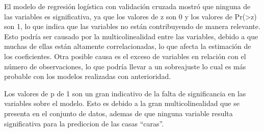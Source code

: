 \documentclass[
]{article}
\begin{document}
El modelo de regresión logística con validación cruzada mostró que
ninguna de las variables es significativa, ya que los valores de z son 0
y los valores de Pr(\textgreater\textbar z\textbar) son 1, lo que indica
que las variables no están contribuyendo de manera relevante. Esto
podría ser causado por la multicolinealidad entre las variables, debido
a que muchas de ellas están altamente correlacionadas, lo que afecta la
estimación de los coeficientes. Otra posible causa es el exceso de
variables en relación con el número de observaciones, lo que podría
llevar a un sobreajuste lo cual es más probable con los modelos
realizadas con anterioridad.

Los valores de p de 1 son un gran indicativo de la falta de
significancia en las variables sobre el modelo. Esto es debido a la gran
multicolinealidad que se presenta en el conjunto de datos, ademas de que
ninguna variable resulta significativa para la prediccion de las casas
``caras''.
\end{document}
